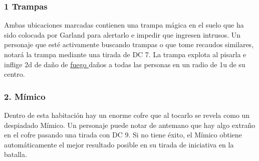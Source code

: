 \subsubsection*{1 Trampas}
Ambas ubicaciones marcadas contienen una trampa mágica en el suelo que ha sido colocada por Garland para alertarlo e impedir que ingresen intrusos. Un personaje que esté activamente buscando trampas o que tome recaudos similares, notará la trampa mediante una tirada de DC 7. La trampa explota al pisarla e inflige 2d de daño de \hyperlink{type}{fuego }daños a todas las personas en un radio de 1u de su centro. \subsubsection*{2. Mímico}
Dentro de esta habitación hay un enorme cofre que al tocarlo se revela como un despiadado Mímico. Un personaje puede notar de antemano que hay algo extraño en el cofre pasando una tirada con DC 9. Si no tiene éxito, el Mímico obtiene automáticamente el mejor resultado posible en su tirada de iniciativa en la batalla.
\vfill


